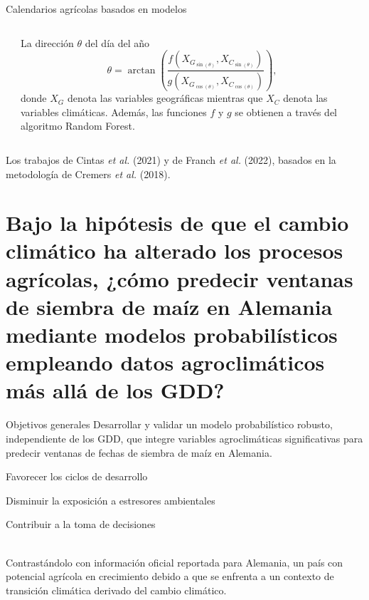 \documentclass[aspectratio=169]{beamer}
\begin{document}
\begin{frame}{Calendarios agrícolas basados en modelos}
	\begin{columns}
		\begin{center}
		\end{center}
		La dirección $\theta$ del día del año
		\[\theta= \arctan\left(\frac{f(X_{G_{\sin(\theta)}}, X_{C_{\sin(\theta)}})}{g(X_{G_{\cos(\theta)}}, X_{C_{\cos(\theta)}})}\right),\]
		donde $X_G$ denota las variables geográficas mientras que  $X_C$ denota las variables climáticas. Además, las funciones $f$ y $g$ se obtienen a través del algoritmo Random Forest. 
	\end{columns}
	\begin{center}
		Los trabajos de Cintas \textit{et al.} (2021) y de Franch \textit{et al.} (2022), basados en la metodología de Cremers \textit{et al.} (2018).
	\end{center}
\end{frame}



\section{Bajo la hipótesis de que el cambio climático ha alterado los procesos agrícolas, ¿cómo predecir ventanas de siembra de maíz en Alemania mediante modelos probabilísticos empleando datos agroclimáticos más allá de los GDD?}


\begin{frame}{Objetivos generales}
	\vspace{-1.5cm}Desarrollar y validar un modelo probabilístico robusto, independiente de los GDD, que integre variables agroclimáticas significativas para predecir ventanas de fechas de siembra de maíz en Alemania.
	\begin{minipage}{0.33\textwidth}
		\pause\begin{block}{Favorecer los ciclos de desarrollo}
		\end{block}
	\end{minipage}%
	\begin{minipage}{0.33\textwidth}
		\pause\begin{block}{Disminuir la exposición a estresores ambientales}
		\end{block}
	\end{minipage}%
	\begin{minipage}{0.33\textwidth}\pause\begin{block}{Contribuir a la toma de decisiones}
	\end{block}
	\end{minipage}
	\,\\
	\pause
	Contrastándolo con información oficial reportada para Alemania, un país con potencial agrícola en crecimiento debido a que se enfrenta a un contexto de transición climática derivado del cambio climático. 
\end{frame}
\end{document}
